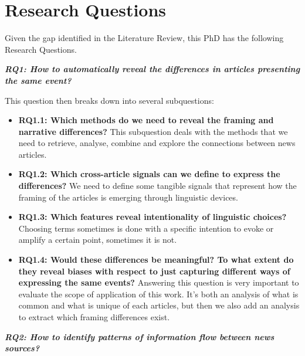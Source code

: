 \chapter{Research Questions}
\label{chap:research_questions}


Given the gap identified in the Literature Review, this PhD has the following Research Questions.

\vspace{12px}

\textit{\textbf{RQ1: How to automatically reveal the differences in articles presenting the same event?}}

\vspace{12px}

This question then breaks down into several subquestions:

\begin{itemize}
    \item \textbf{RQ1.1: Which methods do we need to reveal the framing and narrative differences?} This subquestion deals with the methods that we need to retrieve, analyse, combine and explore the connections between news articles.
    \item \textbf{RQ1.2: Which cross-article signals can we define to express the differences?} We need to define some tangible signals that represent how the framing of the articles is emerging through linguistic devices.
    \item \textbf{RQ1.3: Which features reveal intentionality of linguistic choices?} Choosing terms sometimes is done with a specific intention to evoke or amplify a certain point, sometimes it is not.
    \item \textbf{RQ1.4: Would these differences be meaningful? To what extent do they reveal biases with respect to just capturing different ways of expressing the same events?} Answering this question is very important to evaluate the scope of application of this work. It's both an analysis of what is common and what is unique of each articles, but then we also add an analysis to extract which framing differences exist.   
\end{itemize}


\vspace{12px}

\textit{\textbf{RQ2: How to identify patterns of information flow between news sources?}}

